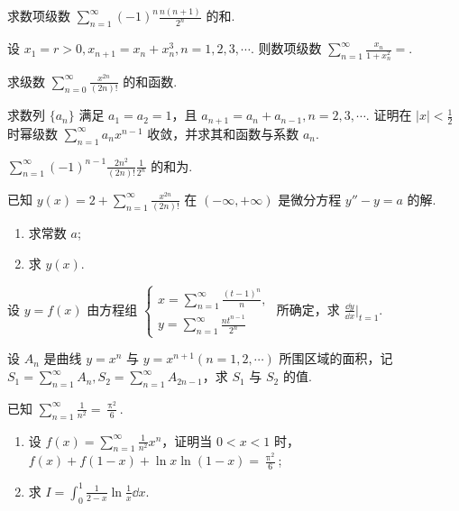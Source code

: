 	\begin{ti}
		求数项级数 $\sum_{n=1}^{\infty} (-1)^{n} \frac{n(n + 1)}{2^{n}}$ 的和.
	\end{ti}

	\begin{ti}
		设 $x_{1} = r > 0, x_{n+1} = x_{n} + x_{n}^{3}, n = 1,2,3,\cdots$. 则数项级数 $\sum_{n=1}^{\infty} \frac{x_{n}}{1 + x_{n}^{2}} = $\htwo.
	\end{ti}

	\begin{ti}
		求级数 $\sum_{n=0}^{\infty} \frac{x^{2n}}{(2n)!}$ 的和函数.
	\end{ti}

	\begin{ti}
		求数列 $\{ a_{n} \}$ 满足 $a_{1} = a_{2} = 1$，且 $a_{n+1} = a_{n} + a_{n-1}, n = 2,3,\cdots$. 证明在 $|x| < \frac{1}{2}$ 时幂级数 $\sum_{n=1}^{\infty} a_{n} x^{n-1}$ 收敛，并求其和函数与系数 $a_{n}$.
	\end{ti}

	\begin{ti}
		$\sum_{n=1}^{\infty} (-1)^{n-1} \frac{2n^{2}}{(2n)!} \frac{1}{2^{n}}$ 的和为\htwo.
	\end{ti}

	\begin{ti}
		已知 $y(x) = 2 + \sum_{n=1}^{\infty} \frac{x^{2n}}{(2n)!}$ 在 $(-\infty,+\infty)$ 是微分方程 $y'' - y = a$ 的解.
		\begin{enumerate}
			\item 求常数 $a$;
			\item 求 $y(x)$.
		\end{enumerate}
	\end{ti}

	\begin{ti}
		设 $y = f(x)$ 由方程组 $\begin{cases}
			x = \sum_{n=1}^{\infty} \frac{(t - 1)^{n}}{n},\\
			y = \sum_{n=1}^{\infty} \frac{n t^{n-1}}{2^{n}}
		\end{cases}$ 所确定，求 $\frac{\dd{y}}{\dd{x}}\bigr|_{t = 1}$.
	\end{ti}

	\begin{ti}
		设 $A_{n}$ 是曲线 $y = x^{n}$ 与 $y = x^{n+1}(n = 1,2,\cdots)$ 所围区域的面积，记 $S_{1} = \sum_{n=1}^{\infty} A_{n}, S_{2} = \sum_{n=1}^{\infty} A_{2n-1}$，求 $S_{1}$ 与 $S_{2}$ 的值.
	\end{ti}

	\begin{ti}
		已知 $\sum_{n=1}^{\infty} \frac{1}{n^{2}} = \frac{\uppi^{2}}{6}$.
		\begin{enumerate}
			\item 设 $f(x) = \sum_{n=1}^{\infty} \frac{1}{n^{2}} x^{n}$，证明当 $0 < x < 1$ 时，$f(x) + f(1 - x) + \ln x \ln (1 - x) = \frac{\uppi^{2}}{6}$;
			\item 求 $I = \int_{0}^{1} \frac{1}{2 - x} \ln \frac{1}{x} \dd{x}$.
		\end{enumerate}
	\end{ti}